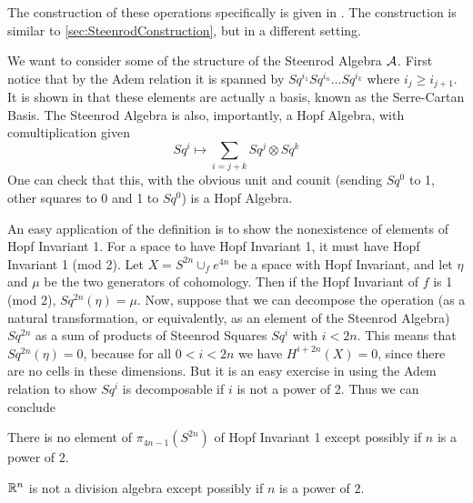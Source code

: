 The construction of these operations specifically is given in \cite[Ch~2]{MosherTengora}.  
The construction is similar to \ref{sec:SteenrodConstruction}, but in a different setting.  

We want to consider some of the structure of the Steenrod Algebra $\mathcal{A}$.  
First notice that by the Adem relation it is spanned by $Sq^{i_1}Sq^{i_n}...Sq^{i_k}$ where $i_j\ge i_{j+1}$.  
It is shown in \cite[Ch~6]{MosherTengora} that these elements are actually a basis, known as the Serre-Cartan Basis.  
The Steenrod Algebra is also, importantly, a Hopf Algebra, with comultiplication given
\[Sq^i\mapsto \sum_{i=j+k} Sq^j\otimes Sq^k\]
One can check that this, with the obvious unit and counit (sending $Sq^0$ to 1, other squares to 0 and 1 to $Sq^0$) is a Hopf Algebra.  

An easy application of the definition is to show the nonexistence of elements of Hopf Invariant 1.
For a space to have Hopf Invariant 1, it must have Hopf Invariant 1 (mod 2).  
Let $X=S^{2n}\cup_f e^{4n}$ be a space with Hopf Invariant, and let $\eta$ and $\mu$ be the two generators of cohomology.  
Then if the Hopf Invariant of $f$ is 1 (mod 2), $Sq^{2n}(\eta)=\mu$.
Now, suppose that we can decompose the operation (as a natural transformation, or equivalently, as an element of the Steenrod Algebra) $Sq^{2n}$ as a sum of products of Steenrod Squares $Sq^i$ with $i<2n$.  
This means that $Sq^{2n}(\eta)=0$, because for all $0<i<2n$ we have $H^{i+2n}(X)=0$, since there are no cells in these dimensions.  
But it is an easy exercise in using the Adem relation to show $Sq^i$ is decomposable if $i$ is not a power of 2.  
Thus we can conclude
\begin{Cor}
  There is no element of $\pi_{4n-1}(S^{2n})$ of Hopf Invariant 1 except possibly if $n$ is a power of $2$.  
\end{Cor}
\begin{Cor}
  $\mathbb{R}^n$ is not a division algebra except possibly if $n$ is a power of $2$.  
\end{Cor}


